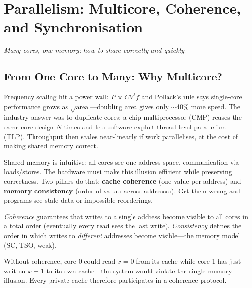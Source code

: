 \chapter{Parallelism: Multicore, Coherence, and Synchronisation}\label{ch:parallel}
\begin{center}\small\textit{Many cores, one memory: how to share correctly and quickly.}\end{center}

\section{From One Core to Many: Why Multicore?}
Frequency scaling hit a power wall: $P \propto CV^2 f$ and Pollack's rule says
single-core performance grows as $\sqrt{\text{area}}$---doubling area gives only
$\sim$40\% more speed. The industry answer was to duplicate cores: a chip-multiprocessor
(CMP) reuses the same core design $N$ times and lets software exploit thread-level
parallelism (TLP). Throughput then scales near-linearly if work parallelises, at the
cost of making shared memory correct.

Shared memory is intuitive: all cores see one address space, communication via
loads/stores. The hardware must make this illusion efficient while preserving
correctness. Two pillars do that: \textbf{cache coherence} (one value per address) and
\textbf{memory consistency} (order of values across addresses). Get them wrong and
programs see stale data or impossible reorderings.

\begin{definition}
\emph{Coherence} guarantees that writes to a single address become visible to all cores
in a total order (eventually every read sees the last write). \emph{Consistency} defines
the order in which writes to \emph{different} addresses become visible---the memory
model (SC, TSO, weak).
\end{definition}

Without coherence, core 0 could read $x=0$ from its cache while core 1 has just written
$x=1$ to its own cache---the system would violate the single-memory illusion. Every
private cache therefore participates in a coherence protocol.

